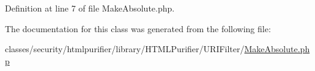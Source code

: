 Definition at line 7 of file Make\+Absolute.\+php.



The documentation for this class was generated from the following file\+:\begin{DoxyCompactItemize}
\item 
classes/security/htmlpurifier/library/\+H\+T\+M\+L\+Purifier/\+U\+R\+I\+Filter/\hyperlink{MakeAbsolute_8php}{Make\+Absolute.\+php}\end{DoxyCompactItemize}
